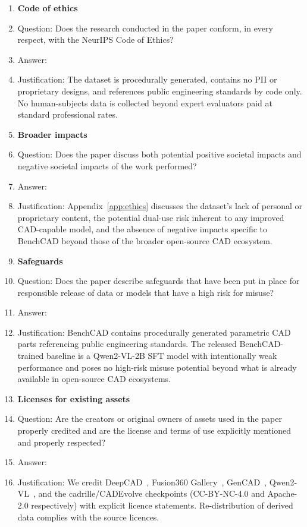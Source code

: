 \documentclass{article}
\begin{document}
\begin{enumerate}
\item {\bf Code of ethics}
    \item[] Question: Does the research conducted in the paper conform, in every respect, with the NeurIPS Code of Ethics?
    \item[] Answer: \answerYes{}
    \item[] Justification: The dataset is procedurally generated, contains no PII or proprietary designs, and references public engineering standards by code only. No human-subjects data is collected beyond expert evaluators paid at standard professional rates.


\item {\bf Broader impacts}
    \item[] Question: Does the paper discuss both potential positive societal impacts and negative societal impacts of the work performed?
    \item[] Answer: \answerYes{}
    \item[] Justification: Appendix~\ref{app:ethics} discusses the dataset's lack of personal or proprietary content, the potential dual-use risk inherent to any improved CAD-capable model, and the absence of negative impacts specific to BenchCAD beyond those of the broader open-source CAD ecosystem.

\item {\bf Safeguards}
    \item[] Question: Does the paper describe safeguards that have been put in place for responsible release of data or models that have a high risk for misuse?
    \item[] Answer: \answerNA{}
    \item[] Justification: BenchCAD contains procedurally generated parametric CAD parts referencing public engineering standards. The released BenchCAD-trained baseline is a Qwen2-VL-2B SFT model with intentionally weak performance and poses no high-risk misuse potential beyond what is already available in open-source CAD ecosystems.

\item {\bf Licenses for existing assets}
    \item[] Question: Are the creators or original owners of assets used in the paper properly credited and are the license and terms of use explicitly mentioned and properly respected?
    \item[] Answer: \answerYes{}
    \item[] Justification: We credit DeepCAD~\citep{Wu2021}, Fusion360 Gallery~\citep{Willis2021fusion}, GenCAD~\citep{GenCAD2025}, Qwen2-VL~\citep{Qwen2VL}, and the cadrille/CADEvolve checkpoints (CC-BY-NC-4.0 and Apache-2.0 respectively) with explicit licence statements. Re-distribution of derived data complies with the source licences.


\end{enumerate}
\end{document}
